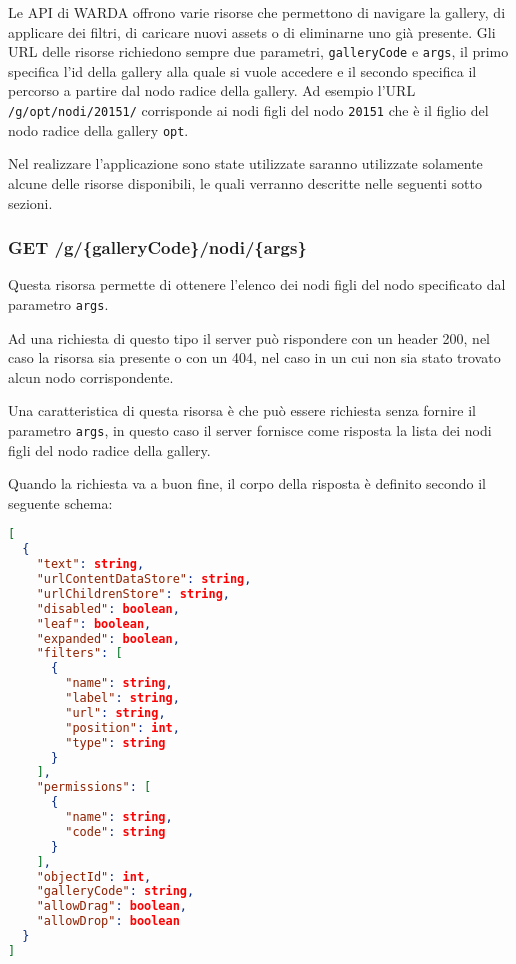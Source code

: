 Le API di WARDA offrono varie risorse che permettono di navigare la gallery, di applicare dei filtri, di caricare nuovi assets o di eliminarne uno già presente.
Gli URL delle risorse richiedono sempre due parametri, \texttt{galleryCode} e \texttt{args}, il primo specifica l'id della gallery alla quale si vuole accedere e il secondo specifica il percorso a partire dal nodo radice della gallery.
Ad esempio l'URL \texttt{/g/opt/nodi/20151/} corrisponde ai nodi figli del nodo \texttt{20151} che è il figlio del nodo radice della gallery \texttt{opt}.

Nel realizzare l'applicazione sono state utilizzate saranno utilizzate solamente alcune delle risorse disponibili, le quali verranno descritte nelle seguenti sotto sezioni. 

\subsubsection{GET /g/\{galleryCode\}/nodi/\{args\}}\label{sec:nodes}

Questa risorsa permette di ottenere l'elenco dei nodi figli del nodo specificato dal parametro \texttt{args}.

Ad una richiesta di questo tipo il server può rispondere con un header 200, nel caso la risorsa sia presente o con un 404, nel caso in un cui non sia stato trovato alcun nodo corrispondente.

Una caratteristica di questa risorsa è che può essere richiesta senza fornire il parametro \texttt{args}, in questo caso il server fornisce come risposta la lista dei nodi figli del nodo radice della gallery.

Quando la richiesta va a buon fine, il corpo della risposta è definito secondo il seguente schema:
\begin{lstlisting}[language=JSON, caption=JSON Schema di GET /g/\{galleryCode\}/nodi/\{args\}]
[
  {
    "text": string,
    "urlContentDataStore": string,
    "urlChildrenStore": string,
    "disabled": boolean,
    "leaf": boolean,
    "expanded": boolean,
    "filters": [
      {
        "name": string,
        "label": string,
        "url": string,
        "position": int,
        "type": string
      }
    ],
    "permissions": [
      {
        "name": string,
        "code": string
      }
    ],
    "objectId": int,
    "galleryCode": string,
    "allowDrag": boolean,
    "allowDrop": boolean
  }
]
\end{lstlisting}
\FloatBarrier

